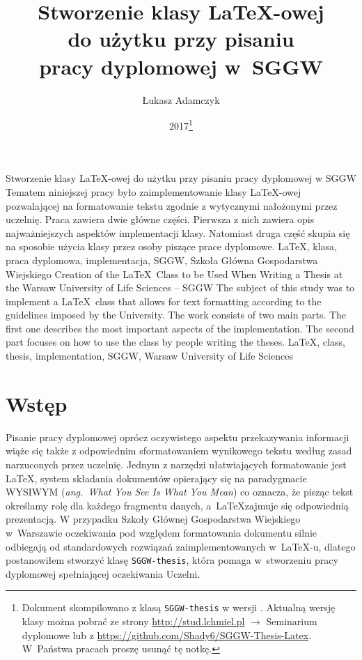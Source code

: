 \documentclass{SGGW-thesis}
\title{Stworzenie klasy \LaTeX-owej\\do użytku przy pisaniu\\pracy dyplomowej w~SGGW}
\author{Łukasz Adamczyk}
\date{2017\footnote{Dokument skompilowano z klasą {\tt SGGW-thesis} w wersji \version. Aktualną wersję klasy można pobrać ze strony \url{http://stud.lchmiel.pl} $\rightarrow$ Seminarium dyplomowe lub z \url{https://github.com/Shady6/SGGW-Thesis-Latex}. W~Państwa pracach proszę usunąć tę notkę.}}
\begin{document}
\maketitle
\statementpage
\abstractpage
{Stworzenie klasy \LaTeX-owej do użytku przy pisaniu pracy dyplomowej w SGGW}
{Tematem niniejszej pracy było zaimplementowanie klasy \LaTeX-owej pozwalającej na formatowanie tekstu zgodnie z wytycznymi nałożonymi przez uczelnię. Praca zawiera dwie główne części. Pierwsza z nich zawiera opis najważniejszych aspektów implementacji klasy. Natomiast druga część skupia się na sposobie użycia klasy przez osoby piszące prace dyplomowe.}
{LaTeX, klasa, praca dyplomowa, implementacja, SGGW, Szkoła Główna Gospodarstwa Wiejskiego}
{Creation of the \LaTeX\ Class to be Used When Writing a Thesis at the Warsaw University of Life Sciences -- SGGW}
{The subject of this study was to implement a \LaTeX\ class that allows for text formatting according to the guidelines imposed by the University. The work consists of two main parts. The first one describes the most important aspects of the implementation. The second part focuses on how to use the class by people writing the theses.}
{LaTeX, class, thesis, implementation, SGGW, Warsaw University of Life Sciences}


{
  \doublespacing
  \tableofcontents
}

\startchapterfromoddpage %

\chapter{Wstęp}
Pisanie pracy dyplomowej oprócz oczywistego aspektu przekazywania informacji wiąże się także z odpowiednim sformatowaniem wynikowego tekstu według zasad narzuconych przez uczelnię. Jednym z narzędzi ułatwiających formatowanie jest \LaTeX, system składania dokumentów opierający się na paradygmacie WYSIWYM ({\em ang.\ What You See Is What You Mean}) co oznacza, że pisząc tekst określamy rolę dla każdego fragmentu danych, a~\LaTeX zajmuje się odpowiednią prezentacją. W przypadku Szkoły Głównej Gospodarstwa Wiejskiego w~Warszawie oczekiwania pod względem formatowania dokumentu silnie odbiegają od standardowych rozwiązań zaimplementowanych w~\LaTeX-u, dlatego postanowiłem stworzyć klasę {\tt SGGW-thesis}, która pomaga w~stworzeniu pracy dyplomowej spełniającej oczekiwania Uczelni.
\end{document}
